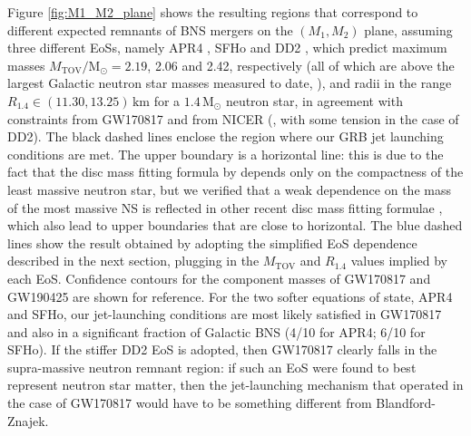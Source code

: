\documentclass[]{aa}
\newcommand{\resp}[1]{#1}
\begin{document}
Figure \ref{fig:M1_M2_plane} shows the resulting regions that correspond to different expected remnants of BNS mergers on the $(M_1,M_2)$ plane, assuming three different EoSs, namely APR4 \citep[][]{Akmal1998}, SFHo and DD2 \citep[][]{Hempel2012}, which predict maximum masses $M_\mathrm{TOV}/\mathrm{M_\odot}=2.19$, 2.06 and 2.42, respectively (all of which are above the largest Galactic neutron star masses measured to date, \citealt{Lynch2013,Fonseca2021}), and radii in the range  $R_\mathrm{1.4}\in (11.30,13.25)\,\mathrm{km}$ for a $1.4\,\mathrm{M_\odot}$ neutron star, in agreement with constraints from GW170817 \citep{Abbott2018_GW170817_EoS,Abbott2019_GW170817_properties} and from NICER (\citealt{Miller2019,Raaijmakers2019,Raaijmakers2020,Landry2020}, \resp{with some tension in the case of DD2}). The black dashed lines enclose the region where our GRB jet launching conditions are met. The upper boundary is a horizontal line: this is due to the fact that the disc mass fitting formula by \cite{Kruger2020} depends only on the compactness of the least massive neutron star, but we verified \resp{that a weak dependence on the mass of the most massive NS is reflected in} other recent disc mass fitting formulae \citep{Dietrich2020,Barbieri2021}, \resp{which also lead to upper boundaries that are close to horizontal}. The blue dashed lines show the result obtained by adopting the simplified EoS dependence described in the next section, plugging in the $M_\mathrm{TOV}$ and $R_{1.4}$ values implied by each EoS. Confidence contours for the component masses of GW170817 \citep{Abbott2019_GW170817_properties} and GW190425 \citep{Abbott2020_GW190425} are shown for reference. For the two softer equations of state, APR4 and SFHo, our jet-launching conditions are most likely satisfied in GW170817 and also in a significant fraction of Galactic BNS (4/10 for APR4; 6/10 for SFHo). If the stiffer DD2 EoS is adopted, then GW170817 clearly falls in the supra-massive neutron remnant region: if such an EoS were found to best represent neutron star matter, then the jet-launching mechanism \resp{that operated in the case of GW170817} would have to be something different from Blandford-Znajek. 
\end{document}
